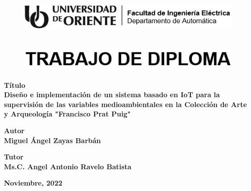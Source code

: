 \thispagestyle{empty}


\begin{figure}[h]
    \centering
    \includegraphics[width=15cm, height=2cm]{imagenes/identidad en blanco y negro.jpg}
\end{figure}

\vspace{1cm}

\begin{figure}[h]
    \centering
    \includegraphics[width=14cm, height=1.4cm]{imagenes/trabajo de diploma}
\end{figure}

\vspace{1cm}

\begin{center}
    \textbf{\large
        Título\\
        Diseño e implementación de un sistema basado en IoT para la supervisión de las variables medioambientales en la Colección de Arte y Arqueología "Francisco Prat Puig"}
    \vspace{1cm}

    \textbf{\large Autor\\
    Miguel Ángel Zayas Barbán}
    \vspace{1cm}

    \textbf{\large Tutor\\
    Ms.C. Angel Antonio Ravelo Batista}

    \vfill
    \textbf{\large Noviembre, 2022}   
\end{center}

 

